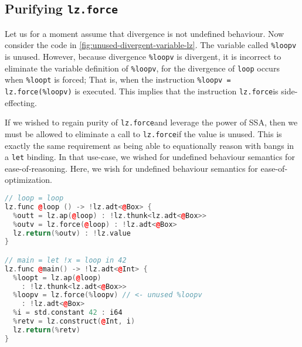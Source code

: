 \documentclass[sigplan,\review anonymous]{acmart}
\newcommand{\lz}{\texttt{lz} }
\newcommand{\lzforce}{\texttt{lz.force}}
\begin{document}
\subsection{Purifying \lzforce}

Let us for a moment assume that divergence is not undefined behaviour. Now consider
the code in \autoref{fig:unused-divergent-variable-lz}. The variable called
\texttt{\%loopv} is unused. However, because divergence \texttt{\%loopv} is
divergent, it is incorrect to eliminate the variable definition of 
\texttt{\%loopv}, for the divergence of \texttt{loop} occurs when \texttt{\%loopt} is forced;
That is, when the instruction \texttt{\%loopv = lz.force(\%loopv)} is executed.
This implies that the instruction \lzforce is side-effecting.


If we wished to regain purity of \lzforce and leverage the power of
SSA, then we must be allowed to eliminate a call to \lzforce if the
value is unused. This is exactly the same requirement as being able to 
equationally reason with bangs in a \texttt{let} binding. In that use-case,
we wished for undefined behaviour semantics for ease-of-reasoning. Here, we wish
for undefined behaviour semantics for ease-of-optimization. 

\begin{lstlisting}[language=c++, caption=The SSA encoding of a lazy program with divergence in the \lz dialect.  Note the unused divergent variable \texttt{\%loopv}]
// loop = loop
lz.func @loop () -> !lz.adt<@Box> {
  %outt = lz.ap(@loop) : !lz.thunk<lz.adt<@Box>> 
  %outv = lz.force(@loop) : !lz.adt<@Box>
  lz.return(%outv) : !lz.value
}

// main = let !x = loop in 42
lz.func @main() -> !lz.adt<@Int> {
  %loopt = lz.ap(@loop) 
    : !lz.thunk<lz.adt<@Box>>
  %loopv = lz.force(%loopv) // <- unused %loopv
    : !lz.adt<@Box>
  %i = std.constant 42 : i64
  %retv = lz.construct(@Int, i)
  lz.return(%retv)
}
\end{lstlisting}
\end{document}

